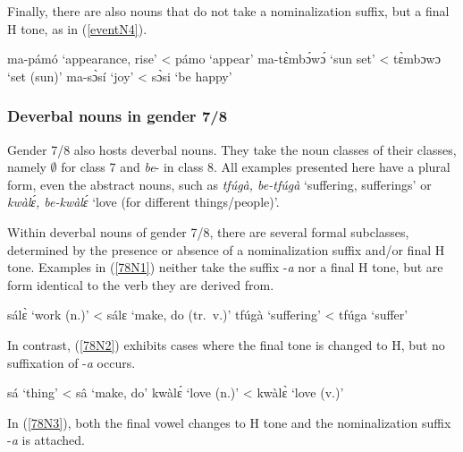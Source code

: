 \noindent Finally, there are also nouns that do not take a nominalization suffix, but a final H tone, as in (\ref{eventN4}).

\begin{exe}
\ex\label{eventN4} 
\begin{xlist}
\ex ma-pámó `appearance, rise' < pámo `appear'
\ex ma-tɛ̀mbɔ́wɔ́ `sun set' < tɛ̀mbɔwɔ `set (sun)'
\ex ma-sɔ̀sí `joy'  < sɔ̀si `be happy'
\end{xlist}
\end{exe}


\subsubsection{Deverbal nouns in gender 7/8}
\label{NOM78}



Gender 7/8 also hosts deverbal nouns. They take the noun classes of their classes, namely $\emptyset$ for class 7 and {\itshape be}- in class 8. All examples presented here have a plural form, even the abstract nouns, such as {\itshape tfúgà, be-tfúgà} `suffering, sufferings' or {\itshape kwàlɛ́, be-kwàlɛ́} `love (for different things/people)'.

Within deverbal nouns of gender 7/8, there are several formal subclasses, determined by the presence or absence of a nominalization suffix and/or final H tone. Examples in (\ref{78N1}) neither take the suffix -{\itshape a} nor a final H tone, but are form identical to the verb they are derived from.

\begin{exe}
\ex\label{78N1} 
\begin{xlist}
\ex sálɛ̀ `work (n.)' < sálɛ `make, do (tr.\ v.)'
\ex tfúgà `suffering' < tfúga `suffer'
\end{xlist}
\end{exe}

\noindent In contrast, (\ref{78N2}) exhibits cases where the final tone is changed to H, but no suffixation of -{\itshape a} occurs.

\begin{exe}
\ex\label{78N2} 
\begin{xlist}
\ex sá `thing' < sâ `make, do'
\ex kwàlɛ́ `love (n.)' < kwàlɛ̀ `love (v.)'
\end{xlist}
\end{exe}

\noindent In (\ref{78N3}), both the final vowel changes to H tone and the nominalization suffix -{\itshape a} is attached.

